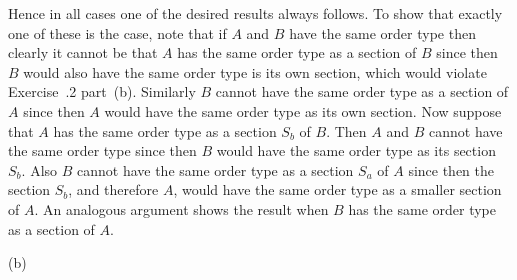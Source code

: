 {{    Hence in all cases one of the desired results always follows.
    To show that exactly one of these is the case, note that if $A$ and $B$ have the same order type then clearly it cannot be that $A$ has the same order type as a section of $B$ since then $B$ would also have the same order type is its own section, which would violate Exercise~\secl.2 part~(b).
    Similarly $B$ cannot have the same order type as a section of $A$ since then $A$ would have the same order type as its own section.
    Now suppose that $A$ has the same order type as a section $S_b$ of $B$.
    Then $A$ and $B$ cannot have the same order type since then $B$ would have the same order type as its section $S_b$.
    Also $B$ cannot have the same order type as a section $S_a$ of $A$ since then the section $S_b$, and therefore $A$, would have the same order type as a smaller section of $A$.
    An analogous argument shows the result when $B$ has the same order type as a section of $A$.
  }

  (b)
}

